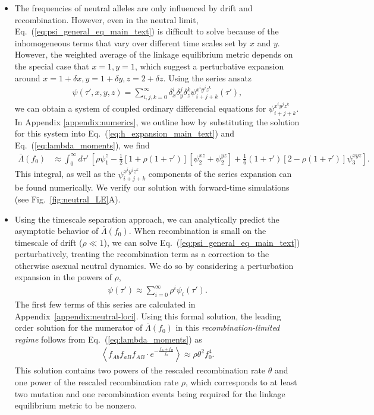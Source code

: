 \documentclass[aps,rmp,twocolumn,groupedaddress,floatfix,notitlepage]{revtex4-1}
\begin{document}
\begin{itemize}
\item The frequencies of neutral alleles are only influenced by drift and recombination. However, even in the neutral limit, Eq.~(\ref{eq:psi_general_eq_main_text}) is difficult to solve because of the inhomogeneous terms that vary over different time scales set by $x$ and $y$. However, the weighted average of the linkage equilibrium metric depends on the special case that $x=1, y=1$, which suggest a perturbative expansion around $x=1+\delta x, y=1+\delta y, z=2+\delta z$. Using the series ansatz \begin{align}\label{eq:psi_xyz_expansion}
    \psi(\tau', x, y, z) 
    = \sum_{i, j, k=0}^{\infty} \delta_x^i \delta_y^j \delta_z^k \psi_{i + j + k}^{x^i y^j z^k}(\tau'),
\end{align}
we can obtain a system of coupled ordinary differencial equations for $\psi_{i+j+k}^{x^iy^jz^k}$. In Appendix \ref{appendix:numerics}, we outline how by substituting the solution for this system into Eq.~(\ref{eq:h_expansion_main_text}) and Eq.~(\ref{eq:lambda_moments}), we find 
\begin{align}\label{eq:num_lambda_unperturbed_main_text}
    \bar{\Lambda}(f_0) & \approx  \int_0^{\infty} d\tau'\, \left[ \rho \psi_1^z - \frac{1}{2}\left[1+\rho(1+\tau')\right]\left[\psi_2^{xz} + \psi_2^{yz}\right] + \frac{1}{6} (1+\tau') \left[2-\rho(1+\tau')\right] \psi_3^{xyz} \right].
\end{align}
This integral, as well as the $\psi_{i+j+k}^{x^iy^jz^k}$ components of the series expansion can be found numerically. We verify our solution with forward-time simulations (see Fig.~\ref{fig:neutral_LE}A).

\item Using the timescale separation approach, we can analytically predict the asymptotic behavior of $\bar{\Lambda}(f_0)$. When recombination is small on the timescale of drift ($\rho \ll 1$), we can solve Eq.~(\ref{eq:psi_general_eq_main_text}) perturbatively, treating the recombination term as a correction to the otherwise asexual neutral dynamics. We do so by considering a perturbation expansion in the powers of $\rho$,
\begin{align}\label{eq:z_series}
    \psi(\tau') \approx \sum_{i=0}^{\infty} \rho^{i}\psi_i(\tau').
\end{align}
The first few terms of this series are calculated in Appendix~\ref{appendix:neutral-loci}. Using this formal solution, the leading order solution for the numerator of $\bar{\Lambda}(f_0)$ in this \emph{recombination-limited regime} follows from Eq.~(\ref{eq:lambda_moments}) as 
\begin{align}\label{eq:lambda_num_small_rho_neutral_main_text}
    \left\langle f_{Ab}f_{aB}f_{AB}\cdot e^{-\frac{f_{A}+f_{B}}{f_0}}\right\rangle \approx \rho \theta^2 f_0^4.
\end{align}
This solution contains two powers of the rescaled recombination rate $\theta$ and one power of the rescaled recombination rate $\rho$, which corresponds to at least two mutation and one recombination events being required for the linkage equilibrium metric to be nonzero. 


\end{itemize}
\end{document}
